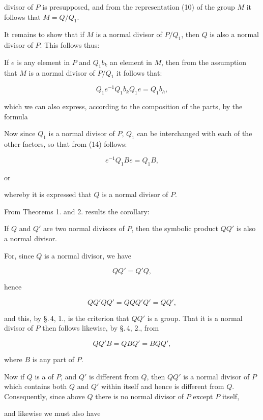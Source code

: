 divisor of $P$ is presupposed, and from the representation (10)
of the group $M$ it follows that $M = Q/Q_1$.

It remains to show that if $M$ is a normal divisor of
$P/Q_1$, then $Q$ is also a normal divisor of $P$. This follows thus:

If $e$ is any element in $P$ and $Q_1 b_k$ an element in $M$,
then from the assumption that $M$ is a normal divisor of $P/Q_1$ it follows that:

\[ Q_1 e^{-1} Q_1 b_k Q_1 e = Q_1 b_h, \]

which we can also express, according to the composition of the parts, by the formula


Now since $Q_1$ is a normal divisor of $P$,
$Q_1$ can be interchanged with each of the other factors, so
that from (14) follows:

\[ e^{-1} Q_1 B e = Q_1 B, \]

or


whereby it is expressed that $Q$ is a normal divisor of $P$.

From Theorems 1. and 2. results the corollary:


If $Q$ and $Q'$ are two normal divisors of $P$, then the
symbolic product $Q Q'$ is also a normal divisor.

For, since $Q$ is a normal divisor, we have

\[ Q Q' = Q' Q, \]

hence

\[ Q Q' Q Q' = Q Q Q' Q' = Q Q', \]

and this, by \S.\,4, 1., is the criterion that $Q Q'$ is a group.
That it is a normal divisor of $P$ then follows
likewise, by \S.\,4, 2., from

\[ Q Q' B = Q B Q' = B Q Q', \]

where $B$ is any part of $P$.

Now if $Q$ is a  of $P$, and $Q'$ is
different from $Q$, then $Q Q'$ is a normal divisor of $P$ which
contains both $Q$ and $Q'$ within itself and hence is different from $Q$.
Consequently, since above $Q$ there is no normal divisor of $P$
except $P$ itself,


and likewise we must also have

